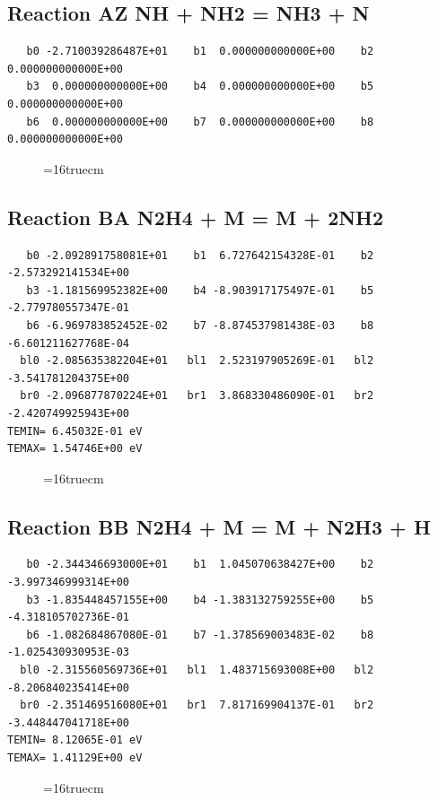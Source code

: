 \documentclass[12pt,dvipdfm]{article}
\begin{document}
\subsection{
Reaction AZ NH + NH2 = NH3 + N}
\begin{small}\begin{verbatim}
   b0 -2.710039286487E+01    b1  0.000000000000E+00    b2  0.000000000000E+00
   b3  0.000000000000E+00    b4  0.000000000000E+00    b5  0.000000000000E+00
   b6  0.000000000000E+00    b7  0.000000000000E+00    b8  0.000000000000E+00
   \end{verbatim}\end{small}
\begin{figure}[h!]
\label{n2rates}
\epsfxsize=16truecm
\end{figure}
\newpage

\subsection{
Reaction BA      N2H4  + M  =  M + 2NH2 }
\begin{small}\begin{verbatim}
   b0 -2.092891758081E+01    b1  6.727642154328E-01    b2 -2.573292141534E+00
   b3 -1.181569952382E+00    b4 -8.903917175497E-01    b5 -2.779780557347E-01
   b6 -6.969783852452E-02    b7 -8.874537981438E-03    b8 -6.601211627768E-04
  bl0 -2.085635382204E+01   bl1  2.523197905269E-01   bl2 -3.541781204375E+00
  br0 -2.096877870224E+01   br1  3.868330486090E-01   br2 -2.420749925943E+00
TEMIN= 6.45032E-01 eV
TEMAX= 1.54746E+00 eV
   \end{verbatim}\end{small}
\begin{figure}[h!]
\label{n2rates}
\epsfxsize=16truecm
\end{figure}
\newpage

\subsection{
Reaction BB N2H4 + M = M + N2H3 + H }
\begin{small}\begin{verbatim}
   b0 -2.344346693000E+01    b1  1.045070638427E+00    b2 -3.997346999314E+00
   b3 -1.835448457155E+00    b4 -1.383132759255E+00    b5 -4.318105702736E-01
   b6 -1.082684867080E-01    b7 -1.378569003483E-02    b8 -1.025430930953E-03
  bl0 -2.315560569736E+01   bl1  1.483715693008E+00   bl2 -8.206840235414E+00
  br0 -2.351469516080E+01   br1  7.817169904137E-01   br2 -3.448447041718E+00
TEMIN= 8.12065E-01 eV
TEMAX= 1.41129E+00 eV
   \end{verbatim}\end{small}
\begin{figure}[h!]
\label{n2rates}
\epsfxsize=16truecm
\end{figure}
\newpage
\end{document}
